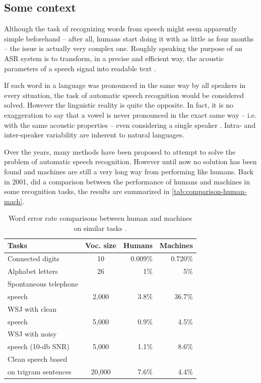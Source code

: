 \subsection{Some context}

Although the task of recognizing words from speech might seem apparently simple beforehand -- after all, humans start doing it with as little as four months -- the issue is actually very complex one. Roughly speaking the purpose of an \ac{ASR} system is to transform, in a precise and efficient way, the acoustic parameters of a speech signal into readable text \cite{Rabiner2007}.

If each word in a language was pronounced in the same way by all speakers in every situation, the task of automatic speech recognition would be considered solved. However the linguistic reality is quite the opposite. In fact, it is no exaggeration to say that a vowel is never pronounced in the exact same way -- i.e. with the same acoustic properties -- even considering a single speaker \cite{Johnson2004}. Intra- and inter-speaker variability are inherent to natural languages.

Over the years, many methods have been 
proposed to attempt to solve the problem of automatic speech recognition. 
However until now no solution has been found and machines are still
a very long way from performing like humans. Back in 2001, \citep{Huang2001} did a comparison between the performance of humans and machines in some recognition tasks, the results are summarized in \autoref{tab:comparison-human-mach}.

\begin{table}[!ht]
  \caption[Word error rate comparisons between human and machines on similar tasks \citep{Huang2001}.]{Word error rate comparisons between human and machines on similar tasks \citep{Huang2001}.}
  \smallskip
  \centering
  \begin{tabular}{lcrr} \toprule
      \textbf{Tasks} & \textbf{Voc. size} & \textbf{Humans} & \textbf{Machines} \\ \midrule
      \small Connected digits & 10 & 0.009\% & 0.720\% \\
      \small Alphabet letters & 26 & 1\% & 5\% \\
      \small Spontaneous telephone \\ speech & 2,000 & 3.8\% & 36.7\% \\
      \small WSJ with clean \\ \small speech & 5,000 & 0.9\% & 4.5\% \\
      \small WSJ with noisy \\ \small speech (10-db SNR) & 5,000 & 1.1\% & 8.6\% \\
      \small Clean speech based \\ \small on trigram sentences & 20,000 & 7.6\% & 4.4\% \\
    \bottomrule
  \end{tabular}
  \label{tab:comparison-human-mach}
\end{table}

